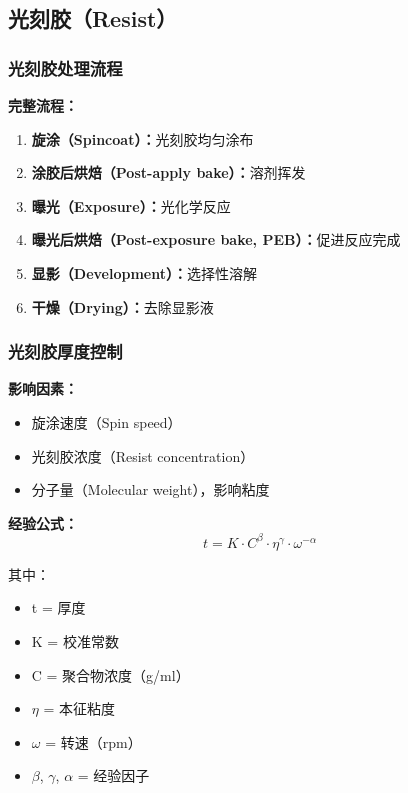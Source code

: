 \documentclass[UTF8,12pt,a4paper]{ctexart}
\begin{document}
\subsection{光刻胶（Resist）}

\subsubsection{光刻胶处理流程}

\textbf{完整流程：}
\begin{enumerate}
    \item \textbf{旋涂（Spincoat）：}光刻胶均匀涂布
    \item \textbf{涂胶后烘焙（Post-apply bake）：}溶剂挥发
    \item \textbf{曝光（Exposure）：}光化学反应
    \item \textbf{曝光后烘焙（Post-exposure bake, PEB）：}促进反应完成
    \item \textbf{显影（Development）：}选择性溶解
    \item \textbf{干燥（Drying）：}去除显影液
\end{enumerate}

\subsubsection{光刻胶厚度控制}

\textbf{影响因素：}
\begin{itemize}
    \item 旋涂速度（Spin speed）
    \item 光刻胶浓度（Resist concentration）
    \item 分子量（Molecular weight），影响粘度
\end{itemize}

\textbf{经验公式：}
\begin{equation}
t = K \cdot C^\beta \cdot \eta^\gamma \cdot \omega^{-\alpha}
\end{equation}

其中：
\begin{itemize}
    \item t = 厚度
    \item K = 校准常数
    \item C = 聚合物浓度（g/ml）
    \item $\eta$ = 本征粘度
    \item $\omega$ = 转速（rpm）
    \item $\beta$, $\gamma$, $\alpha$ = 经验因子
\end{itemize}
\end{document}
